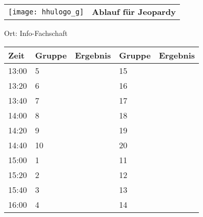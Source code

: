 \documentclass[a4paper,10pt]{article}
\def\spiele{Jeopardy}
\def\raume{Info-Fachschaft}
\begin{document}
   \newpage
  \begin{tabularx}{\textwidth}{lc}
    \texttt{[image: hhulogo\_g]}
  & {\Huge \textbf{Ablauf für \spiele}}
  \end{tabularx}
  \LARGE
  \begin{center}
    \vspace{1cm} 
    Ort: \raume
  \end{center}
    \vspace{2cm} 
    \begin{tabularx}{\textwidth}{X||X|X||X|X}
	\textbf{Zeit} &\textbf{Gruppe} & \textbf{Ergebnis} &\textbf{Gruppe} & \textbf{Ergebnis}  	\\ \hline \hline
	13:00 &	5	&	&15	&	\\ \hline
	13:20 &	6	&	&16	&	\\ \hline
	13:40 &	7	&	&17	&	\\ \hline

	14:00 &	8	&	&18	&	\\ \hline
	14:20 &	9	&	&19	&	\\ \hline
	14:40 &	10	&	&20	&	\\ \hline

	15:00 &	1	&	&11	&	\\ \hline
	15:20 &	2	&	&12	&	\\ \hline
	15:40 &	3	&	&13	&	\\ \hline

	16:00 &	4	&	&14	&	\\ \hline
      
    \end{tabularx}
   
\end{document}
